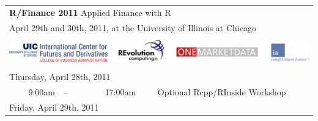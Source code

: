 \documentclass[11pt]{article}
\newcommand{\ra}[1]{\renewcommand{\arraystretch}{#1}}  %
\newcommand{\mylinecolor}[1]{\color{#1}\vspace{-8pt}}  %
\begin{document}
\thispagestyle{empty}


\ra{1.05} \sf

\begin{tabular}{rlrlp{5in}} %

  \multicolumn{5}{l}{\Huge \textbf{\color{KeynoteTalk} R/Finance 2011} \huge \phantom{i} Applied Finance with R} \\
  \multicolumn{5}{l}{\large \color{Breaks} April 29th and 30th, 2011, at the University of Illinois at Chicago} \\[3pt]

  \bottomrule \\

  \multicolumn{5}{l}{
    \centering
    \includegraphics[page=1,scale=0.15]{alllogos.pdf}
  } \\[5pt]

  \bottomrule \\[3pt]

  \multicolumn{5}{l}{\large \color{Breaks} Thursday, April 28th, 2011} \\
  \color{Breaks} 9:00am & \color{Breaks}-- & \color{Breaks} 17:00am &   & \small{\mylinecolor{Breaks} Optional Rcpp/RInside Workshop} \\[12pt]

  \multicolumn{5}{l}{\large Friday, April 29th, 2011} \\


\end{tabular}
\end{document}
